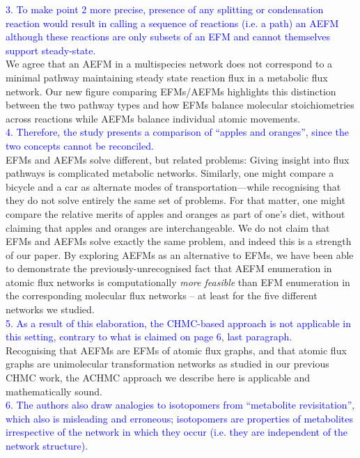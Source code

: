\documentclass[11pt]{article}
\begin{document}
\noindent\textcolor{blue}{3. To make point 2 more precise, presence of any
splitting or condensation reaction would result in calling a sequence of
reactions (i.e. a path) an AEFM although these reactions are only subsets
of an EFM and cannot themselves support steady-state.}\\

We agree that an AEFM in a multispecies network does not correspond to
a minimal pathway maintaining steady state reaction flux in a metabolic
flux network. Our new figure comparing EFMs/AEFMs highlights this
distinction between the two pathway types and how EFMs balance molecular
stoichiometries across reactions while AEFMs balance individual atomic
movements.\\

\noindent\textcolor{blue}{4. Therefore, the study presents a comparison of
``apples and oranges'', since the two concepts cannot be reconciled.}\\

EFMs and AEFMs solve different, but related problems: Giving
insight into flux pathways is complicated metabolic networks. Similarly,
one might compare a bicycle and a car as alternate modes of
transportation---while recognising that they do not solve entirely the
same set of problems. For that matter, one might compare the relative
merits of apples and oranges as part of one's diet, without claiming that
apples and oranges are interchangeable. We do not claim that EFMs and
AEFMs solve exactly the same problem, and indeed this is a strength of our
paper. By exploring AEFMs as an alternative to EFMs, we have been able to
demonstrate the previously-unrecognised fact that AEFM enumeration in
atomic flux networks is computationally \textit{more feasible} than EFM
enumeration in the corresponding molecular flux networks -- at least for
the five different networks we studied.\\

\noindent\textcolor{blue}{5. As a result of this elaboration, the
CHMC-based approach is not applicable in this setting, contrary to what is
claimed on page 6, last paragraph.}\\

Recognising that AEFMs are EFMs of atomic flux graphs, and that atomic
flux graphs are unimolecular transformation networks as studied in our
previous CHMC work, the ACHMC approach we describe here is applicable and
mathematically sound.\\

\noindent\textcolor{blue}{6. The authors also draw analogies to
isotopomers from “metabolite revisitation”, which also is misleading and
erroneous; isotopomers are properties of metabolites irrespective of the
network in which they occur (i.e. they are independent of the network
structure).}\\
\end{document}

